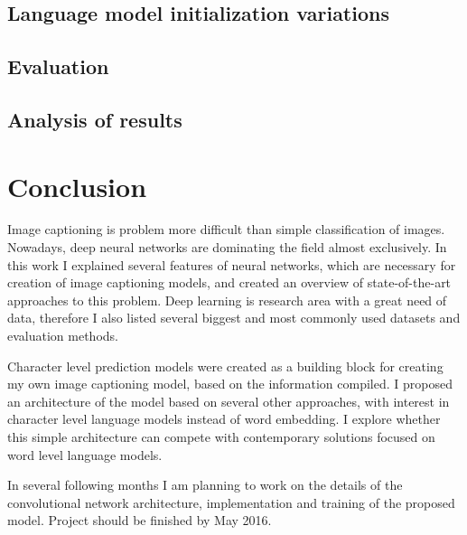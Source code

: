 \section{Language model initialization variations}
\section{Evaluation}
\section{Analysis of results}

\chapter{Conclusion}\label{chp:conclusion}


Image captioning is problem more difficult than simple classification of images. Nowadays, deep neural networks are dominating the field almost exclusively. In this work I explained several features of neural networks, which are necessary for creation of image captioning models, and created an overview of state-of-the-art approaches to this problem. Deep learning is research area with a great need of data, therefore I also listed several biggest and most commonly used datasets and evaluation methods.

Character level prediction models were created as a building block for creating my own image captioning model, based on the information compiled. I proposed an architecture of the model based on several other approaches, with interest in character level language models instead of word embedding. I explore whether this simple architecture can compete with contemporary solutions focused on word level language models.

In several following months I am planning to work on the details of the convolutional network architecture, implementation and training of the proposed model. Project should be finished by May 2016.


